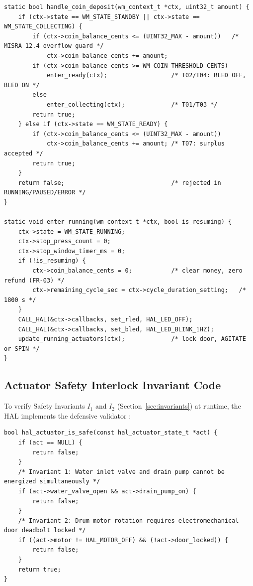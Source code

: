 \begin{lstlisting}[caption={Safe coin accumulation and cycle initiation}]
static bool handle_coin_deposit(wm_context_t *ctx, uint32_t amount) {
    if (ctx->state == WM_STATE_STANDBY || ctx->state == WM_STATE_COLLECTING) {
        if (ctx->coin_balance_cents <= (UINT32_MAX - amount))   /* MISRA 12.4 overflow guard */
            ctx->coin_balance_cents += amount;
        if (ctx->coin_balance_cents >= WM_COIN_THRESHOLD_CENTS)
            enter_ready(ctx);                  /* T02/T04: RLED OFF, BLED ON */
        else
            enter_collecting(ctx);             /* T01/T03 */
        return true;
    } else if (ctx->state == WM_STATE_READY) {
        if (ctx->coin_balance_cents <= (UINT32_MAX - amount))
            ctx->coin_balance_cents += amount; /* T07: surplus accepted */
        return true;
    }
    return false;                              /* rejected in RUNNING/PAUSED/ERROR */
}

static void enter_running(wm_context_t *ctx, bool is_resuming) {
    ctx->state = WM_STATE_RUNNING;
    ctx->stop_press_count = 0;
    ctx->stop_window_timer_ms = 0;
    if (!is_resuming) {
        ctx->coin_balance_cents = 0;           /* clear money, zero refund (FR-03) */
        ctx->remaining_cycle_sec = ctx->cycle_duration_setting;   /* 1800 s */
    }
    CALL_HAL(&ctx->callbacks, set_rled, HAL_LED_OFF);
    CALL_HAL(&ctx->callbacks, set_bled, HAL_LED_BLINK_1HZ);
    update_running_actuators(ctx);             /* lock door, AGITATE or SPIN */
}
\end{lstlisting}

\subsection{Actuator Safety Interlock Invariant Code}
\label{sec:actuator-code}

To verify Safety Invariants $I_1$ and $I_2$ (Section~\ref{sec:invariants}) at runtime, the HAL
implements the defensive validator :

\begin{lstlisting}[caption={Runtime actuator safety invariant validation logic}]
bool hal_actuator_is_safe(const hal_actuator_state_t *act) {
    if (act == NULL) {
        return false;
    }
    /* Invariant 1: Water inlet valve and drain pump cannot be energized simultaneously */
    if (act->water_valve_open && act->drain_pump_on) {
        return false;
    }
    /* Invariant 2: Drum motor rotation requires electromechanical door deadbolt locked */
    if ((act->motor != HAL_MOTOR_OFF) && (!act->door_locked)) {
        return false;
    }
    return true;
}
\end{lstlisting}

